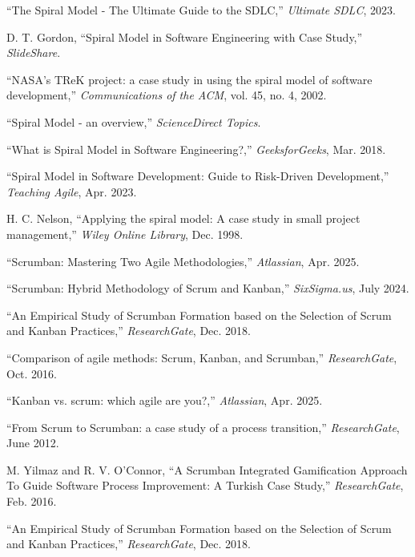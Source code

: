 \documentclass[conference]{IEEEtran}
\begin{document}
\begin{thebibliography}{00}
 ``The Spiral Model - The Ultimate Guide to the SDLC,'' \emph{Ultimate SDLC}, 2023.

 D. T. Gordon, ``Spiral Model in Software Engineering with Case Study,'' \emph{SlideShare}.

 ``NASA's TReK project: a case study in using the spiral model of software development,'' \emph{Communications of the ACM}, vol. 45, no. 4, 2002.

 ``Spiral Model - an overview,'' \emph{ScienceDirect Topics}.

 ``What is Spiral Model in Software Engineering?,'' \emph{GeeksforGeeks}, Mar. 2018.

 ``Spiral Model in Software Development: Guide to Risk-Driven Development,'' \emph{Teaching Agile}, Apr. 2023.

 H. C. Nelson, ``Applying the spiral model: A case study in small project management,'' \emph{Wiley Online Library}, Dec. 1998.

 ``Scrumban: Mastering Two Agile Methodologies,'' \emph{Atlassian}, Apr. 2025.

 ``Scrumban: Hybrid Methodology of Scrum and Kanban,'' \emph{SixSigma.us}, July 2024.

 ``An Empirical Study of Scrumban Formation based on the Selection of Scrum and Kanban Practices,'' \emph{ResearchGate}, Dec. 2018.

 ``Comparison of agile methods: Scrum, Kanban, and Scrumban,'' \emph{ResearchGate}, Oct. 2016.

 ``Kanban vs. scrum: which agile are you?,'' \emph{Atlassian}, Apr. 2025.

 ``From Scrum to Scrumban: a case study of a process transition,'' \emph{ResearchGate}, June 2012.

 M. Yilmaz and R. V. O'Connor, ``A Scrumban Integrated Gamification Approach To Guide Software Process Improvement: A Turkish Case Study,'' \emph{ResearchGate}, Feb. 2016.

 ``An Empirical Study of Scrumban Formation based on the Selection of Scrum and Kanban Practices,'' \emph{ResearchGate}, Dec. 2018.


\end{thebibliography}
\end{document}
